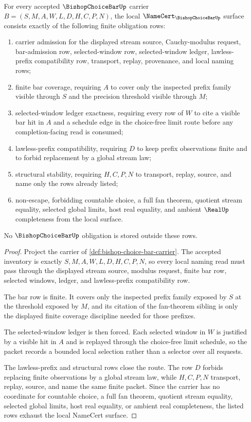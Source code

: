 \begin{theorem}
\label{thm:bishop-choice-bar-namecert-obligations}
For every accepted $\BishopChoiceBarUp$ carrier $B=(S,M,A,W,L,D,H,C,P,N)$, the local $\NameCert_{\BishopChoiceBarUp}$ surface consists exactly of the following finite obligation rows:
\begin{enumerate}
\item carrier admission for the displayed stream source, Cauchy-modulus request, bar-admission row, selected-window row, selected-window ledger, lawless-prefix compatibility row, transport, replay, provenance, and local naming rows;
\item finite bar coverage, requiring $A$ to cover only the inspected prefix family visible through $S$ and the precision threshold visible through $M$;
\item selected-window ledger exactness, requiring every row of $W$ to cite a visible bar hit in $A$ and a schedule edge in the choice-free limit route before any completion-facing read is consumed;
\item lawless-prefix compatibility, requiring $D$ to keep prefix observations finite and to forbid replacement by a global stream law;
\item structural stability, requiring $H,C,P,N$ to transport, replay, source, and name only the rows already listed;
\item non-escape, forbidding countable choice, a full fan theorem, quotient stream equality, selected global limits, host real equality, and ambient $\RealUp$ completeness from the local surface.
\end{enumerate}
No $\BishopChoiceBarUp$ obligation is stored outside these rows.
\end{theorem}
\begin{proof}
Project the carrier of \autoref{def:bishop-choice-bar-carrier}. The accepted inventory is exactly $S,M,A,W,L,D,H,C,P,N$, so every local naming read must pass through the displayed stream source, modulus request, finite bar row, selected windows, ledger, and lawless-prefix compatibility row.

The bar row is finite. It covers only the inspected prefix family exposed by $S$ at the threshold exposed by $M$, and its citation of the fan-theorem sibling is only the displayed finite coverage discipline needed for those prefixes.

The selected-window ledger is then forced. Each selected window in $W$ is justified by a visible hit in $A$ and is replayed through the choice-free limit schedule, so the packet records a bounded local selection rather than a selector over all requests.

The lawless-prefix and structural rows close the route. The row $D$ forbids replacing finite observations by a global stream law, while $H,C,P,N$ transport, replay, source, and name the same finite packet. Since the carrier has no coordinate for countable choice, a full fan theorem, quotient stream equality, selected global limits, host real equality, or ambient real completeness, the listed rows exhaust the local NameCert surface.
\end{proof}

